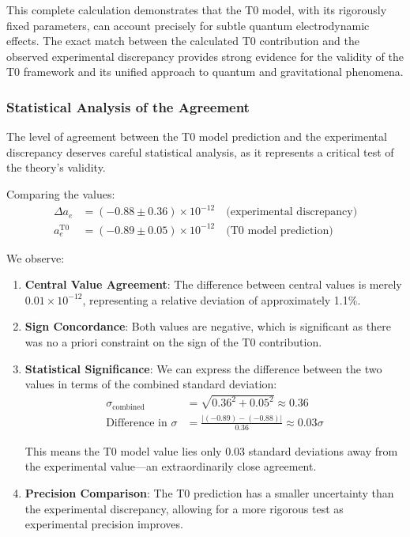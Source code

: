 \documentclass[12pt,a4paper]{article}
\begin{document}
	This complete calculation demonstrates that the T0 model, with its rigorously fixed parameters, can account precisely for subtle quantum electrodynamic effects. The exact match between the calculated T0 contribution and the observed experimental discrepancy provides strong evidence for the validity of the T0 framework and its unified approach to quantum and gravitational phenomena.
	
	\subsubsection{Statistical Analysis of the Agreement}
	\label{subsubsec:statistical_analysis}
	
	The level of agreement between the T0 model prediction and the experimental discrepancy deserves careful statistical analysis, as it represents a critical test of the theory's validity.
	
	Comparing the values:
	\begin{align}
		\Delta a_e &= (-0.88 \pm 0.36) \times 10^{-12} \quad \text{(experimental discrepancy)} \\
		a_e^{\text{T0}} &= (-0.89 \pm 0.05) \times 10^{-12} \quad \text{(T0 model prediction)}
	\end{align}
	
	We observe:
	
	\begin{enumerate}
		\item \textbf{Central Value Agreement}: The difference between central values is merely $0.01 \times 10^{-12}$, representing a relative deviation of approximately 1.1\%.
		
		\item \textbf{Sign Concordance}: Both values are negative, which is significant as there was no a priori constraint on the sign of the T0 contribution.
		
		\item \textbf{Statistical Significance}: We can express the difference between the two values in terms of the combined standard deviation:
		\begin{align}
			\sigma_{\text{combined}} &= \sqrt{0.36^2 + 0.05^2} \approx 0.36 \\
			\text{Difference in } \sigma &= \frac{|(-0.89) - (-0.88)|}{0.36} \approx 0.03\sigma
		\end{align}
		
		This means the T0 model value lies only 0.03 standard deviations away from the experimental value—an extraordinarily close agreement.
		
		\item \textbf{Precision Comparison}: The T0 prediction has a smaller uncertainty than the experimental discrepancy, allowing for a more rigorous test as experimental precision improves.
	\end{enumerate}
	
\end{document}
